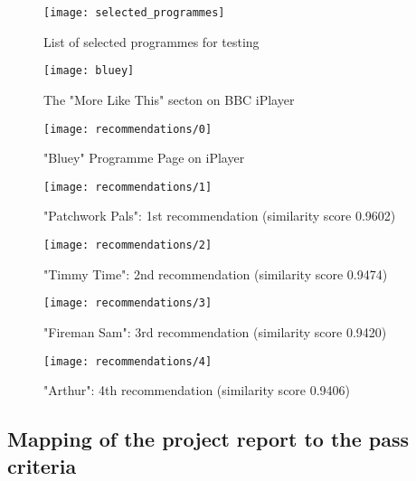 \begin{figure}[H]
  \centering
  \texttt{[image: selected\_programmes]}
  \caption{List of selected programmes for testing}
  \label{fig:selected_programmes}
\end{figure}

\begin{figure}[H]
  \centering
  \texttt{[image: bluey]}
  \caption{The "More Like This" secton on BBC iPlayer}
  \label{fig:bluey}
\end{figure}

\begin{figure}[H]
  \centering
  \texttt{[image: recommendations/0]}
  \caption{"Bluey" Programme Page on iPlayer}
  \label{fig:recommendations:0}
\end{figure}

\begin{figure}[H]
  \centering
  \texttt{[image: recommendations/1]}
  \caption{"Patchwork Pals": 1st recommendation (similarity score 0.9602)}
  \label{fig:recommendations:1}
\end{figure}

\begin{figure}[H]
  \centering
  \texttt{[image: recommendations/2]}
  \caption{"Timmy Time": 2nd recommendation (similarity score 0.9474)}
  \label{fig:recommendations:1}
\end{figure}

\begin{figure}[H]
  \centering
  \texttt{[image: recommendations/3]}
  \caption{"Fireman Sam": 3rd recommendation (similarity score 0.9420)}
  \label{fig:recommendations:1}
\end{figure}

\begin{figure}[H]
  \centering
  \texttt{[image: recommendations/4]}
  \caption{"Arthur": 4th recommendation (similarity score 0.9406)}
  \label{fig:recommendations:1}
\end{figure}

\subsection{Mapping of the project report to the pass criteria}
